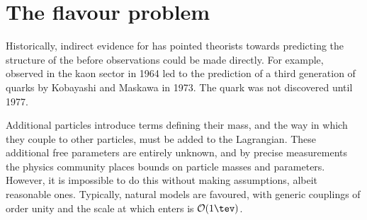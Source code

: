\section{The flavour problem}

Historically, indirect evidence for \np has pointed theorists towards predicting the structure of
the \sm before observations could be made directly.
For example, \CPV observed in the kaon sector in 1964 led to the prediction of a third generation of
quarks by Kobayashi and Maskawa in 1973.
The \bquark quark was not discovered until 1977.





Additional \np particles introduce terms defining their mass, and the way in which they couple
to other particles, must be added to the Lagrangian.
These additional free parameters are entirely unknown, and by precise measurements the physics
community places bounds on \np particle masses and parameters.
However, it is impossible to do this without making assumptions, albeit reasonable ones.
Typically, natural models are favoured, with generic couplings of order unity and the
scale at which \np enters is $\mathcal{O}(1\tev)$.

